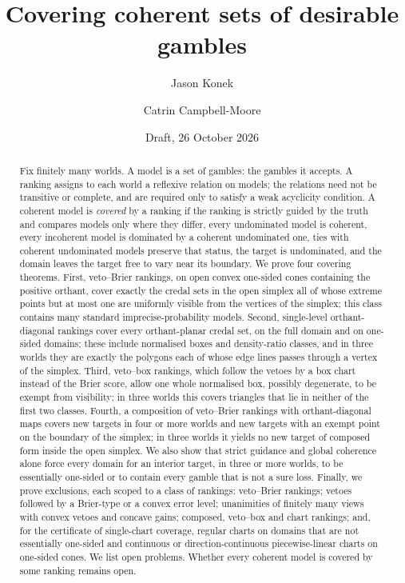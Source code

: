 \documentclass[11pt]{article}
\title{Covering coherent sets of desirable gambles}
\author{Jason Konek \and Catrin Campbell-Moore}
\date{Draft, 26 October 2026}
\theoremstyle{plain}
\theoremstyle{definition}
\theoremstyle{remark}
\begin{document}
\maketitle

\begin{abstract}
Fix finitely many worlds. A model is a set of gambles: the gambles it accepts. A ranking
assigns to each world a reflexive relation on models; the relations need not be transitive
or complete, and are required only to satisfy a weak acyclicity condition. A coherent
model is \emph{covered} by a ranking if the ranking is strictly guided by the truth and
compares models only where they differ, every undominated model is coherent, every
incoherent model is dominated by a coherent undominated one, ties with coherent
undominated models preserve that status, the target is undominated, and the domain leaves
the target free to vary near its boundary. We prove four covering theorems. First,
veto--Brier rankings, on open convex one-sided cones containing the positive orthant,
cover exactly the credal sets in the open simplex all of whose extreme points but at most
one are uniformly visible from the vertices of the simplex; this class contains many
standard imprecise-probability models. Second, single-level orthant-diagonal rankings
cover every orthant-planar credal set, on the full domain and on one-sided domains; these
include normalised boxes and density-ratio classes, and in three worlds they are exactly
the polygons each of whose edge lines passes through a vertex of the simplex. Third,
veto--box rankings, which follow the vetoes by a box chart instead of the Brier score,
allow one whole normalised box, possibly degenerate, to be exempt from visibility; in
three worlds this covers triangles that lie in neither of the first two classes. Fourth,
a composition of veto--Brier rankings with orthant-diagonal maps covers new targets in four
or more worlds and new targets with an exempt point on the boundary of the simplex; in
three worlds it yields no new target of composed form inside the open simplex. We also
show that strict guidance and global coherence alone force every domain for an interior
target, in three or more worlds, to be essentially one-sided or to contain every gamble
that is not a sure loss. Finally, we prove exclusions, each scoped to a class of
rankings: veto--Brier rankings; vetoes followed by a Brier-type or a convex error level;
unanimities of finitely many views with convex vetoes and concave gains; composed,
veto--box and chart rankings; and, for the certificate of single-chart coverage, regular
charts on domains that are not essentially one-sided and continuous or direction-continuous
piecewise-linear charts on one-sided cones. We list open problems. Whether every coherent model is covered by some ranking
remains open.
\end{abstract}
\end{document}
